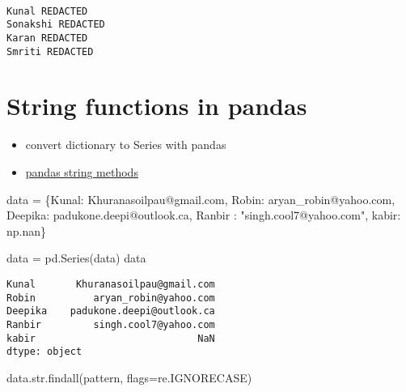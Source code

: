 \documentclass[
  letterpaper,
  DIV=11,
  numbers=noendperiod]{scrreprt}
\newenvironment{Shaded}{\begin{snugshade}}{\end{snugshade}}
\newcommand{\BuiltInTok}[1]{\textcolor[rgb]{0.00,0.23,0.31}{#1}}
\newcommand{\NormalTok}[1]{\textcolor[rgb]{0.00,0.23,0.31}{#1}}
\newcommand{\OperatorTok}[1]{\textcolor[rgb]{0.37,0.37,0.37}{#1}}
\newcommand{\StringTok}[1]{\textcolor[rgb]{0.13,0.47,0.30}{#1}}
\providecommand{\tightlist}{%
  \setlength{\itemsep}{0pt}\setlength{\parskip}{0pt}}\usepackage{longtable,booktabs,array}
\begin{document}
\begin{verbatim}

Kunal REDACTED
Sonakshi REDACTED
Karan REDACTED
Smriti REDACTED
\end{verbatim}

\hypertarget{string-functions-in-pandas}{%
\section{String functions in pandas}\label{string-functions-in-pandas}}

\begin{itemize}
\tightlist
\item
  convert dictionary to Series with pandas
\item
  \href{https://learning.oreilly.com/library/view/python-for-data/9781098104023/ch07.html\#table_vec_string}{pandas
  string methods}
\end{itemize}

\begin{Shaded}
\begin{Highlighting}[]
\NormalTok{data }\OperatorTok{=}\NormalTok{ \{}\StringTok{\textquotesingle{}Kunal\textquotesingle{}}\NormalTok{: }\StringTok{\textquotesingle{}Khuranasoilpau@gmail.com\textquotesingle{}}\NormalTok{, }\StringTok{\textquotesingle{}Robin\textquotesingle{}}\NormalTok{: }\StringTok{\textquotesingle{}aryan\_robin@yahoo.com\textquotesingle{}}\NormalTok{,}
       \StringTok{\textquotesingle{}Deepika\textquotesingle{}}\NormalTok{: }\StringTok{\textquotesingle{}padukone.deepi@outlook.ca\textquotesingle{}}\NormalTok{, }\StringTok{\textquotesingle{}Ranbir\textquotesingle{}}\NormalTok{ : }\StringTok{"singh.cool7@yahoo.com"}\NormalTok{,}
       \StringTok{\textquotesingle{}kabir\textquotesingle{}}\NormalTok{: np.nan\}}
        

\NormalTok{data }\OperatorTok{=}\NormalTok{ pd.Series(data)}
\NormalTok{data}
\end{Highlighting}
\end{Shaded}

\begin{verbatim}
Kunal       Khuranasoilpau@gmail.com
Robin          aryan_robin@yahoo.com
Deepika    padukone.deepi@outlook.ca
Ranbir         singh.cool7@yahoo.com
kabir                            NaN
dtype: object
\end{verbatim}

\begin{Shaded}
\begin{Highlighting}[]
\NormalTok{data.}\BuiltInTok{str}\NormalTok{.findall(pattern, flags}\OperatorTok{=}\NormalTok{re.IGNORECASE)}
\end{Highlighting}
\end{Shaded}
\end{document}
